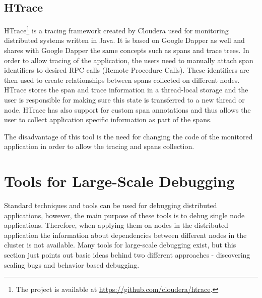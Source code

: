  \subsection{HTrace}
 \label{htrace}
 HTrace\footnote{The project is available at \url{https://github.com/cloudera/htrace}.} is a tracing framework created by Cloudera used for monitoring distributed systems written in Java. It is based on Google Dapper as well and shares with Google Dapper the same concepts such as spans and trace trees. In order to allow tracing of the application, the users need to manually attach span identifiers to desired RPC calls (Remote Procedure Calls). These identifiers are then used to create relationships between spans collected on different nodes. HTrace stores the span and trace information in a thread-local storage and the user is responsible for making sure this state is transferred to a new thread or node. HTrace has also support for custom span annotations and thus allows the user to collect application specific information as part of the spans. 
 
 The disadvantage of this tool is the need for changing the code of the monitored application in order to allow the tracing and spans collection.
\section{Tools for Large-Scale Debugging}
Standard techniques and tools can be used for debugging distributed applications, however, the main purpose of these tools is to debug single node applications. Therefore, when applying them on nodes in the distributed application the information about dependencies between different nodes in the cluster is not available. Many tools for large-scale debugging exist, but this section just points out basic ideas behind two different approaches - discovering scaling bugs and behavior based debugging. 

